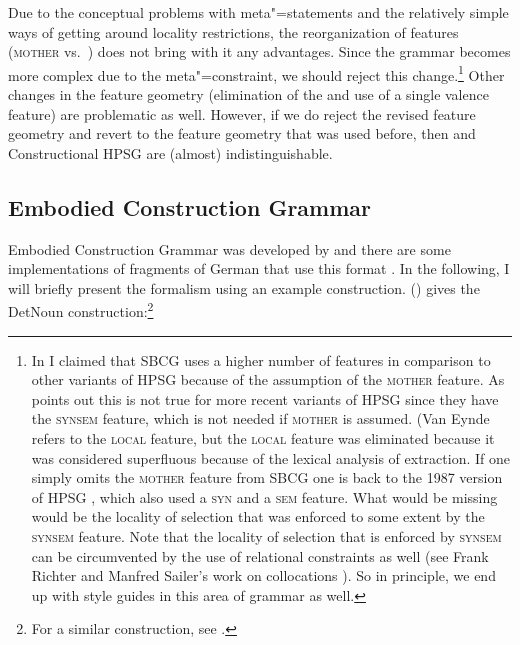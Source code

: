 Due to the conceptual problems with meta"=statements and the relatively simple ways of getting
around locality restrictions, the reorganization of features (\textsc{mother} vs.\ \synsem) does not bring with it any advantages. Since the grammar becomes more complex due to the meta"=constraint, we should
reject this change.\footnote{%
  In  I claimed that SBCG uses a higher number of features in comparison
  to other variants of HPSG because of the assumption of the \textsc{mother} feature. As \citet{VanEynde2015a} points out this is not true for more recent variants of HPSG since
 they have the \textsc{synsem} feature, which is not needed if \textsc{mother} is assumed. (Van Eynde refers to the \textsc{local}
 feature, but the \textsc{local} feature was eliminated because it was considered superfluous
 because of the lexical analysis of extraction.
 If one simply omits the \textsc{mother} feature from SBCG one is back to
 the 1987 version of HPSG \citep{ps}, which also used a \textsc{syn} and a \textsc{sem} feature. What would be
 missing would be the locality of selection \citep[]{Sag2012a} that was enforced to some extent by the \textsc{synsem}
 feature. Note that the locality of selection that is enforced by \textsc{synsem} can be
 circumvented by the use of relational constraints as well (see Frank Richter and Manfred Sailer's work on
 collocations \citep{RS99b-u,SS2003a}). So in principle, we end up with style guides in this
 area of grammar as well.%
} 
Other changes in the feature geometry (elimination of the \localf and use of a single valence
feature) are problematic as well. However, if we do reject the revised feature geometry and revert
to the feature geometry that was used before, then \sbcg and Constructional HPSG \citep{Sag97a} are (almost) indistinguishable.

\subsection{Embodied Construction Grammar}
\label{sec-ECG}

Embodied Construction Grammar was developed by \citet{BC2005a}  and there are some implementations of fragments of German that use this
format \citep{PMAZ2006a-u}. In the following, I will briefly present the formalism using an example construction.
() gives the DetNoun construction:\footnote{%
  For a similar construction, see .
}


